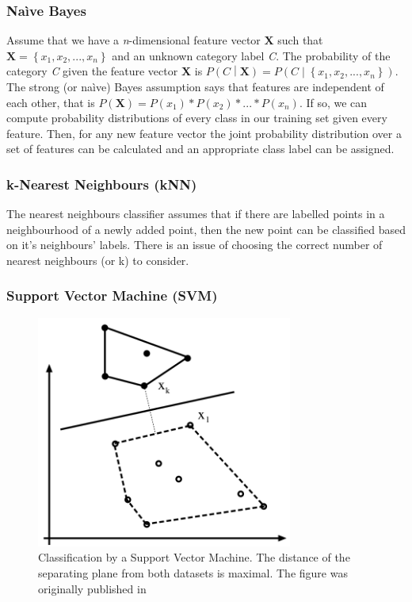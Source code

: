 	\subsubsection{Na\`ive Bayes}
	Assume that we have a \textit{n}-dimensional feature vector $\mathbf{X}$ such that $\mathbf{X} = \left\{x_1, x_2, ... , x_\mathit{n}\right\}$ and an unknown category label \textit{C}. The probability of the category \textit{C} given the feature vector \textbf{X} is $P\left(\mathit{C}\middle|\mathbf{X}\right) = P\left(\mathit{C}\middle|\left\{x_1, x_2, ..., x_\mathit{n}\right\}\right)$. The strong (or na\`ive) Bayes assumption says that features are independent of each other, that is $P(\mathbf{X}) = P(x_1)*P(x_2)*...*P(x_\mathit{n})$. If so, we can compute probability distributions of every class in our training set given every feature. Then, for any new feature vector the joint probability distribution over a set of features can be calculated and an appropriate class label can be assigned.
	
	\subsubsection{k-Nearest Neighbours (kNN)}
	The nearest neighbours classifier assumes that if there are labelled points in a neighbourhood of a newly added point, then the new point can be classified based on it's neighbours' labels. There is an issue of choosing the correct number of nearest neighbours (or k) to consider.	
	
	\subsubsection{Support Vector Machine (SVM)}
	\begin{figure}[!ht]
	\centering
	\includegraphics[width=0.75\textwidth]{figs/svm}
	\caption{Classification by a Support Vector Machine. The distance of the separating plane from both datasets is maximal. The figure was originally published in \cite{ponce2011cv}}
	\label{fig:svm}
	\end{figure}
	

